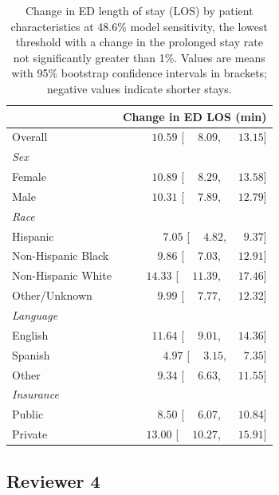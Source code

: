  \begin{table}[htbp]
\centering
\small
\caption{Change in ED length of stay (LOS) by patient characteristics at 48.6\% model sensitivity, the lowest threshold with a change in the prolonged stay rate not significantly greater than 1\%. Values are means with 95\% bootstrap confidence intervals in brackets; negative values indicate shorter stays.}
\label{tab:los_demographics_0.01}
\begin{tabular}{lr}
\toprule
 & Change in ED LOS (min) \\
\midrule
Overall & $\phantom{-}10.59$ [$\phantom{-}8.09$, $\phantom{-}13.15$] \\
\addlinespace
{\textit{Sex}} & \\
\quad Female & $\phantom{-}10.89$ [$\phantom{-}8.29$, $\phantom{-}13.58$] \\
\quad Male & $\phantom{-}10.31$ [$\phantom{-}7.89$, $\phantom{-}12.79$] \\
\addlinespace
{\textit{Race}} & \\
\quad Hispanic & $\phantom{-}7.05$ [$\phantom{-}4.82$, $\phantom{-}9.37$] \\
\quad Non-Hispanic Black & $\phantom{-}9.86$ [$\phantom{-}7.03$, $\phantom{-}12.91$] \\
\quad Non-Hispanic White & $\phantom{-}14.33$ [$\phantom{-}11.39$, $\phantom{-}17.46$] \\
\quad Other/Unknown & $\phantom{-}9.99$ [$\phantom{-}7.77$, $\phantom{-}12.32$] \\
\addlinespace
{\textit{Language}} & \\
\quad English & $\phantom{-}11.64$ [$\phantom{-}9.01$, $\phantom{-}14.36$] \\
\quad Spanish & $\phantom{-}4.97$ [$\phantom{-}3.15$, $\phantom{-}7.35$] \\
\quad Other & $\phantom{-}9.34$ [$\phantom{-}6.63$, $\phantom{-}11.55$] \\
\addlinespace
{\textit{Insurance}} & \\
\quad Public & $\phantom{-}8.50$ [$\phantom{-}6.07$, $\phantom{-}10.84$] \\
\quad Private & $\phantom{-}13.00$ [$\phantom{-}10.27$, $\phantom{-}15.91$] \\
\bottomrule
\end{tabular}
\end{table}
\subsection{Reviewer 4}



